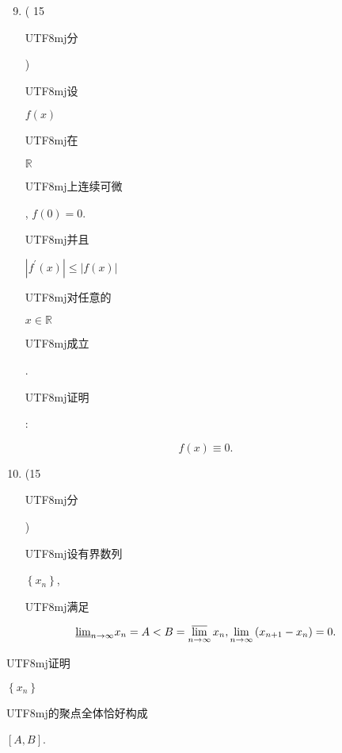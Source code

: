 \documentclass[10pt]{article}
\begin{document}
\begin{enumerate}
  \setcounter{enumi}{8}
  \item ( 15 \begin{CJK}{UTF8}{mj}分\end{CJK}) \begin{CJK}{UTF8}{mj}设\end{CJK} $f(x)$ \begin{CJK}{UTF8}{mj}在\end{CJK} $\mathbb{R}$ \begin{CJK}{UTF8}{mj}上连续可微\end{CJK}, $f(0)=0$. \begin{CJK}{UTF8}{mj}并且\end{CJK} $\left|f^{\prime}(x)\right| \leqslant|f(x)|$ \begin{CJK}{UTF8}{mj}对任意的\end{CJK} $x \in \mathbb{R}$ \begin{CJK}{UTF8}{mj}成立\end{CJK}. \begin{CJK}{UTF8}{mj}证明\end{CJK}:
\end{enumerate}
$$
f(x) \equiv 0 .
$$

\begin{enumerate}
  \setcounter{enumi}{9}
  \item (15 \begin{CJK}{UTF8}{mj}分\end{CJK}) \begin{CJK}{UTF8}{mj}设有界数列\end{CJK} $\left\{x_{n}\right\}$, \begin{CJK}{UTF8}{mj}满足\end{CJK}
\end{enumerate}
$$
\underline{\lim }_{n \rightarrow \infty} x_{n}=A<B=\varlimsup_{n \rightarrow \infty} x_{n}, \lim _{n \rightarrow \infty}\left(x_{n+1}-x_{n}\right)=0 .
$$
\begin{CJK}{UTF8}{mj}证明\end{CJK} $\left\{x_{n}\right\}$ \begin{CJK}{UTF8}{mj}的聚点全体恰好构成\end{CJK} $[A, B]$.
\end{document}
